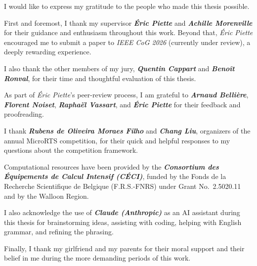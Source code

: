 \vspace*{\fill}

\noindent\hrulefill\quad{}\quad\hrulefill

\bigskip

I would like to express my gratitude to the people who made this thesis possible.

\medskip

First and foremost, I thank my supervisor \textbf{\textit{\'Eric Piette}} and \textbf{\textit{Achille Morenville}} for their guidance and enthusiasm throughout this work. Beyond that, \textit{\'Eric Piette} encouraged me to submit a paper to \emph{IEEE CoG 2026} (currently under review), a deeply rewarding experience.

\medskip

I also thank the other members of my jury, \textbf{\textit{Quentin Cappart}} and \textbf{\textit{Benoît Ronval}}, for their time and thoughtful evaluation of this thesis.

\medskip

As part of \textit{\'Eric Piette}'s peer-review process, I am grateful to \textbf{\textit{Arnaud Bellière}}, \textbf{\textit{Florent Noiset}}, \textbf{\textit{Raphaël Vassart}}, and \textbf{\textit{\'Eric Piette}} for their feedback and proofreading.

\medskip

I thank \textbf{\textit{Rubens de Oliveira Moraes Filho}} and \textbf{\textit{Chang Liu}}, organizers of the annual MicroRTS competition, for their quick and helpful responses to my questions about the competition framework.

\medskip

Computational resources have been provided by the \textbf{\textit{Consortium des Équipements de Calcul Intensif (CÉCI)}}, funded by the Fonds de la Recherche Scientifique de Belgique (F.R.S.-FNRS) under Grant No.~2.5020.11 and by the Walloon Region.

\medskip

I also acknowledge the use of \textbf{\textit{Claude (Anthropic)}} as an AI assistant during this thesis for brainstorming ideas, assisting with coding, helping with English grammar, and refining the phrasing.

\medskip

Finally, I thank my girlfriend and my parents for their moral support and their belief in me during the more demanding periods of this work.~\redheart

